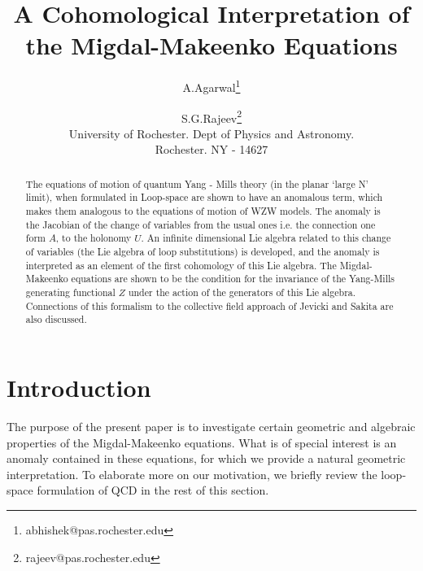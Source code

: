 \documentclass[a4paper,12]{article}
\begin{document}



\title{A Cohomological Interpretation of the Migdal-Makeenko Equations}
\author{A.Agarwal\thanks{abhishek@pas.rochester.edu} \\
\and
 S.G.Rajeev\thanks{rajeev@pas.rochester.edu} \\
University of Rochester. Dept of Physics and Astronomy. \\
Rochester. NY - 14627}
\maketitle


\begin{abstract}
The equations of motion of quantum  Yang - Mills theory (in the planar 
`large N' limit), when formulated 
in Loop-space are shown to have an anomalous term, which makes them 
analogous to the equations of motion of WZW models. The anomaly is 
the Jacobian of the  change of 
 variables from the usual ones i.e. the connection 
one form $A $, to the holonomy $U$. An infinite dimensional Lie algebra 
related to this change of variables (the Lie algebra of loop substitutions) 
is developed, and the anomaly  is interpreted as an element of the first 
cohomology of this Lie algebra. The Migdal-Makeenko equations are shown to 
be the condition for the invariance of the Yang-Mills generating 
functional $Z$ under the action of the generators of this Lie algebra. Connections of this formalism  to the 
collective field approach 
of Jevicki and Sakita are also discussed. 
\end{abstract}

\section{Introduction}
The purpose of the present paper is to investigate certain geometric and 
algebraic properties of the Migdal-Makeenko equations. What is of special 
interest is an anomaly contained in these equations,  
for which we provide a natural geometric interpretation.  To elaborate 
more on our motivation, we briefly review the loop-space formulation 
of 
QCD in the rest of this section.
\end{document}
